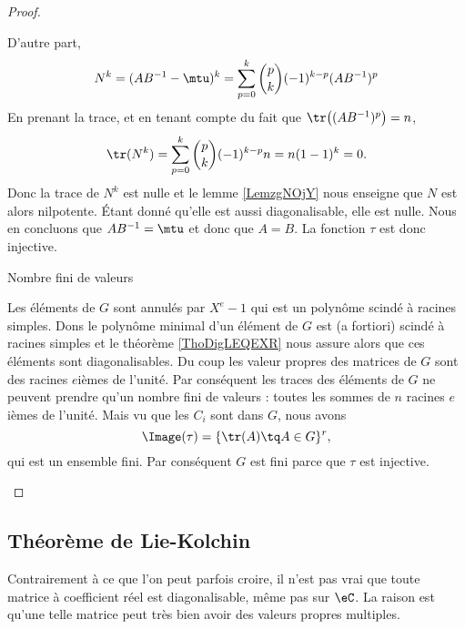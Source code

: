 \begin{proof}
\begin{subproof}
            D'autre part, 
            \begin{equation}
                N^k=(AB^{-1}-\mtu)^k=\sum_{p=0}^k{p\choose k}(-1)^{k-p}(AB^{-1})^p
            \end{equation}
            En prenant la trace, et en tenant compte du fait que \( \tr\big( (AB^{-1})^p \big)=n\),
            \begin{equation}
                \tr(N^k)=\sum_{p=0}^k{p\choose k}(-1)^{k-p}n=n(1-1)^k=0.
            \end{equation}
            Donc la trace de \( N^k\) est nulle et le lemme \ref{LemzgNOjY} nous enseigne que \( N\) est alors nilpotente. Étant donné qu'elle est aussi diagonalisable, elle est nulle. Nous en concluons que \( AB^{-1}=\mtu\) et donc que \( A=B\). La fonction \( \tau\) est donc injective.

        \item[Nombre fini de valeurs]

            Les éléments de \( G\) sont annulés par \( X^e-1\) qui est un polynôme scindé à racines simples. Dons le polynôme minimal d'un élément de \( G\) est (a fortiori) scindé à racines simples et le théorème \ref{ThoDigLEQEXR} nous assure alors que ces éléments sont diagonalisables. Du coup les valeur propres des matrices de \( G\) sont des racines \( e\)ièmes de l'unité. Par conséquent les traces des éléments de \( G\) ne peuvent prendre qu'un nombre fini de valeurs : toutes les sommes de \( n\) racines \( e\)ièmes de l'unité. Mais vu que les \( C_i\) sont dans \( G\), nous avons
            \begin{equation}
                \Image(\tau)=\{ \tr(A)\tq A\in G \}^r,
            \end{equation}
            qui est un ensemble fini. Par conséquent \( G\) est fini parce que \( \tau\) est injective.
    \end{subproof}
\end{proof}

\subsection{Théorème de Lie-Kolchin}

Contrairement à ce que l'on peut parfois croire, il n'est pas vrai que toute matrice à coefficient réel est diagonalisable, même pas sur \( \eC\). La raison est qu'une telle matrice peut très bien avoir des valeurs propres multiples.

